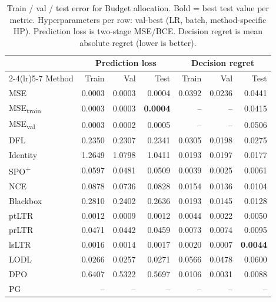 \begin{table}[t]
\centering
\caption{Train / val / test error for Budget allocation. Bold = best test value per metric. Hyperparameters per row: val-best (LR, batch, method-specific HP). Prediction loss is two-stage MSE/BCE. Decision regret is mean absolute regret (lower is better).}
\label{tab:err-budgetalloc}
\setlength{\tabcolsep}{4pt}
\renewcommand{\arraystretch}{1.05}
\begin{tabular}{@{}lrrrrrr@{}}
\toprule
& \multicolumn{3}{c}{Prediction loss} & \multicolumn{3}{c}{Decision regret} \\
\cmidrule(lr){2-4}\cmidrule(lr){5-7}
Method & Train & Val & Test & Train & Val & Test \\
\midrule
MSE & 0.0003 & 0.0003 & 0.0004 & 0.0392 & 0.0236 & 0.0441 \\
MSE\textsubscript{train} & 0.0003 & 0.0003 & \textbf{0.0004} & -- & -- & 0.0415 \\
MSE\textsubscript{val} & 0.0003 & 0.0002 & 0.0005 & -- & -- & 0.0506 \\
DFL & 0.2350 & 0.2307 & 0.2341 & 0.0305 & 0.0198 & 0.0275 \\
Identity & 1.2649 & 1.0798 & 1.0411 & 0.0193 & 0.0197 & 0.0177 \\
SPO\textsuperscript{+} & 0.0597 & 0.0481 & 0.0509 & 0.0039 & 0.0025 & 0.0061 \\
NCE & 0.0878 & 0.0736 & 0.0828 & 0.0154 & 0.0136 & 0.0104 \\
Blackbox & 0.2810 & 0.2402 & 0.2636 & 0.0193 & 0.0145 & 0.0128 \\
ptLTR & 0.0012 & 0.0009 & 0.0012 & 0.0044 & 0.0022 & 0.0050 \\
prLTR & 0.0471 & 0.0442 & 0.0459 & 0.0073 & 0.0074 & 0.0095 \\
lsLTR & 0.0016 & 0.0014 & 0.0017 & 0.0020 & 0.0007 & \textbf{0.0044} \\
LODL & 0.0266 & 0.0257 & 0.0271 & 0.0566 & 0.0478 & 0.0600 \\
DPO & 0.6407 & 0.5322 & 0.5697 & 0.0106 & 0.0031 & 0.0088 \\
PG & -- & -- & -- & -- & -- & -- \\
\bottomrule
\end{tabular}
\end{table}

